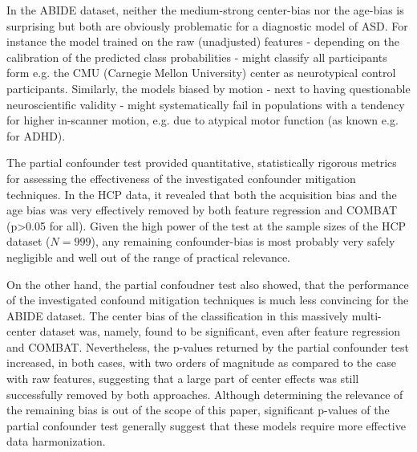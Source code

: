 \documentclass{article}
\begin{document}
In the ABIDE dataset, neither the medium-strong center-bias nor the age-bias is surprising but both are obviously problematic for a diagnostic model of ASD. For instance the model trained on the raw (unadjusted) features - depending on the calibration of the predicted class probabilities - might classify all participants form e.g. the CMU (Carnegie Mellon University) center as neurotypical control participants. Similarly, the models biased by motion - next to having questionable neuroscientific validity - might systematically fail in populations with a tendency for higher in-scanner motion, e.g. due to atypical motor function (as known e.g. for ADHD\citep{eloyan2012automated}).
 
 The partial confounder test provided quantitative, statistically rigorous metrics for assessing the effectiveness of the investigated confounder mitigation techniques. In the HCP data, it revealed that both the acquisition bias and the age bias was very effectively removed by both feature regression and COMBAT (p>0.05 for all). Given the high power of the test at the sample sizes of the HCP dataset ($N=999$), any remaining confounder-bias is most probably very safely negligible and well out of the range of practical relevance.
 
On the other hand, the partial confoudner test also showed, that the performance of the investigated confound mitigation techniques is much less convincing for the ABIDE dataset. The center bias of the classification in this massively multi-center dataset was, namely, found to be significant, even after feature regression and COMBAT. Nevertheless, the p-values returned by the partial confounder test increased, in both cases, with two orders of magnitude as compared to the case with raw features, suggesting that a large part of center effects was still successfully removed by both approaches. Although determining the relevance of the remaining bias is out of the scope of this paper, significant p-values of the partial confounder test generally suggest that these models require more effective data harmonization.
\end{document}
